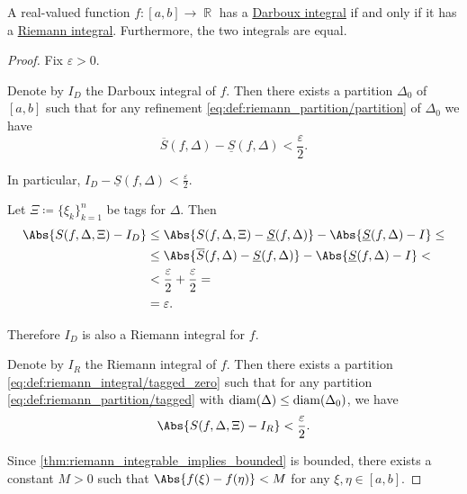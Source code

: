 \begin{proposition}\label{thm:darboux_integral_iff_riemann_integral}
  A real-valued function \( f: [a, b] \to \BbbR \) has a \hyperref[def:darboux_integral]{Darboux integral} if and only if it has a \hyperref[def:riemann_integral]{Riemann integral}. Furthermore, the two integrals are equal.
\end{proposition}
\begin{proof}
  Fix \( \varepsilon > 0 \).

   Denote by \( I_D \) the Darboux integral of \( f \). Then there exists a partition \( \Delta_0 \) of \( [a, b] \) such that for any refinement \eqref{eq:def:riemann_partition/partition} of \( \Delta_0 \) we have
  \begin{equation*}
    \overline{S}(f, \Delta) - \underline{S}(f, \Delta) < \frac \varepsilon 2.
  \end{equation*}

  In particular, \( I_D - \underline{S}(f, \Delta) < \tfrac \varepsilon 2 \).

  Let \( \Xi \coloneqq \{ \xi_k \}_{k=1}^n \) be tags for \( \Delta \). Then
  \begin{align*}
    \Abs{S(f, \Delta, \Xi) - I_D}
    &\leq
    \Abs{S(f, \Delta, \Xi) - \underline{S}(f, \Delta)} - \Abs{\underline{S}(f, \Delta) - I}
    \leq \\ &\leq
    \Abs{\overline{S}(f, \Delta) - \underline{S}(f, \Delta)} - \Abs{\underline{S}(f, \Delta) - I}
    < \\ &<
    \frac \varepsilon 2 + \frac \varepsilon 2
    = \\ &=
    \varepsilon.
  \end{align*}

  Therefore \( I_D \) is also a Riemann integral for \( f \).

   Denote by \( I_R \) the Riemann integral of \( f \). Then there exists a partition \eqref{eq:def:riemann_integral/tagged_zero} such that for any partition \eqref{eq:def:riemann_partition/tagged} with \( \operatorname{diam}(\Delta) \leq \operatorname{diam}(\Delta_0) \), we have
  \begin{equation*}
    \Abs{S(f, \Delta, \Xi) - I_R} < \frac \varepsilon 2.
  \end{equation*}

  Since \eqref{thm:riemann_integrable_implies_bounded} is bounded, there exists a constant \( M > 0 \) such that \( \Abs{f(\xi) - f(\eta)} < M \) for any \( \xi, \eta \in [a, b] \).


\end{proof}
